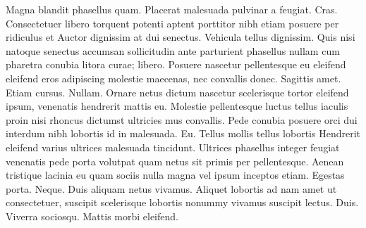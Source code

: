 Magna blandit phasellus quam. Placerat malesuada pulvinar a feugiat. Cras. Consectetuer libero torquent potenti aptent porttitor nibh etiam posuere per ridiculus et Auctor dignissim at dui senectus. Vehicula tellus dignissim. Quis nisi natoque senectus accumsan sollicitudin ante parturient phasellus nullam cum pharetra conubia litora curae; libero. Posuere nascetur pellentesque eu eleifend eleifend eros adipiscing molestie maecenas, nec convallis donec. Sagittis amet. Etiam cursus. Nullam. Ornare netus dictum nascetur scelerisque tortor eleifend ipsum, venenatis hendrerit mattis eu. Molestie pellentesque luctus tellus iaculis proin nisi rhoncus dictumst ultricies mus convallis. Pede conubia posuere orci dui interdum nibh lobortis id in malesuada. Eu. Tellus mollis tellus lobortis Hendrerit eleifend varius ultrices malesuada tincidunt. Ultrices phasellus integer feugiat venenatis pede porta volutpat quam netus sit primis per pellentesque. Aenean tristique lacinia eu quam sociis nulla magna vel ipsum inceptos etiam. Egestas porta. Neque. Duis aliquam netus vivamus. Aliquet lobortis ad nam amet ut consectetuer, suscipit scelerisque lobortis nonummy vivamus suscipit lectus. Duis. Viverra sociosqu. Mattis morbi eleifend.

